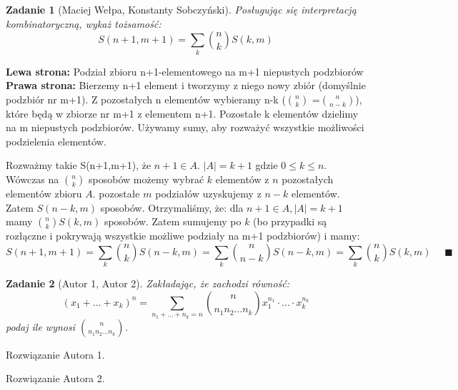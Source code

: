 \documentclass{mwart}
\newtheorem{zad}{Zadanie}[section]
\begin{document}
\begin{zad}[Maciej Wełpa, Konstanty Sobczyński]

    Posługując się interpretacją kombinatoryczną, wykaż tożsamość:
    \[S(n+1,m+1) = \sum_k \binom{n}{k}S(k,m)\]
\end{zad}
\begin{mdframed}
    \textbf{Lewa strona:} Podział zbioru n+1-elementowego na m+1 niepustych podzbiorów\\
    \textbf{Prawa strona:} Bierzemy n+1 element i tworzymy z niego nowy zbiór (domyślnie podzbiór nr m+1). Z pozostałych 
    n elementów wybieramy n-k (\(\binom{n}{k}\) =\(\binom{n}{n-k}\)), które będą w zbiorze nr m+1 z elementem n+1. Pozostałe k elementów dzielimy na m niepustych podzbiorów. Używamy sumy, aby rozważyć wszystkie możliwości podzielenia elementów.
\end{mdframed}
\begin{mdframed}
    Rozważmy takie S(n+1,m+1), że $n+1 \in A$. $|A| = k+1$ gdzie $ 0 \leq k \leq n$. Wówczas na $\binom{n}{k}$ sposobów możemy wybrać $k$ elementów z $n$ pozostałych elementów zbioru $A$. pozostałe $m$ podziałów uzyskujemy z $n-k$ elementów. Zatem $S(n-k,m)$ sposobów. Otrzymaliśmy, że: dla $n+1 \in A, |A| = k+1$ mamy $\binom{n}{k}S(k,m)$ sposobów. Zatem sumujemy po $k$ (bo przypadki są rozłączne i pokrywają wszystkie możliwe podziały na m+1 podzbiorów) i mamy:
    \[S(n+1,m+1) = \sum_k \binom{n}{k}S(n-k,m) = \sum_k \binom{n}{n-k}S(n-k,m) = \sum_k \binom{n}{k}S(k,m)\ \; \; \; \; \blacksquare\]
\end{mdframed}




\begin{zad}[Autor 1, Autor 2]
    Zakładając, że zachodzi równość:
    \[
        (x_1 + ... + x_k)^n = \sum_{n_1+...+n_k=n}\binom{n}{n_1 n_2 ... n_k}x_1^{n_1}\cdot...\cdot x_k^{n_k}
    \]
    podaj ile wynosi $\binom{n}{n_1 n_2 ... n_k}$.
\end{zad}
\begin{mdframed}
    Rozwiązanie Autora 1.
\end{mdframed}
\begin{mdframed}
    Rozwiązanie Autora 2.
\end{mdframed}
\end{document}

